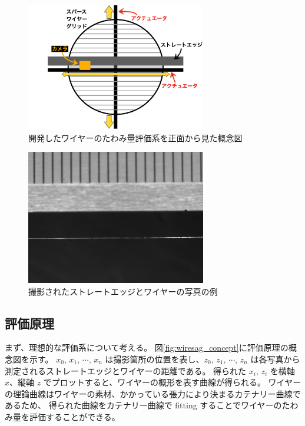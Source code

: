 \documentclass[../../main.tex]{subfiles}
\begin{document}
\begin{figure}[H]
    \centering
    \includegraphics[width=0.7\textwidth]{wiresag/wiresag_system_front.pdf}
    \caption{開発したワイヤーのたわみ量評価系を正面から見た概念図}
    \label{fig:wiresag_system_front}
\end{figure}
\begin{figure}[H]
    \centering
    \includegraphics[width=0.7\textwidth]{wiresag/20241219_UHF_0_wire23_x467_gray.png}
    \caption{撮影されたストレートエッジとワイヤーの写真の例}
    \label{fig:wiresag_picture}    
\end{figure}
\subsection{評価原理}
\label{subsec:wiresag_principle}
まず、理想的な評価系について考える。
図\ref{fig:wiresag_concept}に評価原理の概念図を示す。
$x_{0},\,x_{1},\,\cdots,\,x_{n}$ は撮影箇所の位置を表し、$z_{0},\,z_{1},\,\cdots,\,z_{n}$ は各写真から測定されるストレートエッジとワイヤーの距離である。
得られた $x_{i},\,z_{i}$ を横軸 $x$、縦軸 $z$ でプロットすると、ワイヤーの概形を表す曲線が得られる。
ワイヤーの理論曲線はワイヤーの素材、かかっている張力により決まるカテナリー曲線であるため、
得られた曲線をカテナリー曲線で fitting することでワイヤーのたわみ量を評価することができる。
\end{document}
